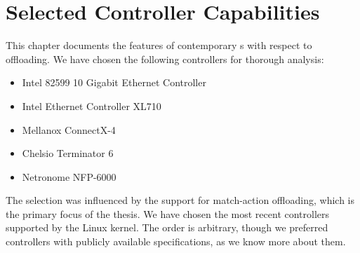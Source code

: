\chapter{Selected Controller Capabilities}
\label{chap:nics}

This chapter documents the features of contemporary s with respect to
offloading. We have chosen the following controllers for thorough analysis:

\begin{itemize}
	\item Intel 82599 10 Gigabit Ethernet Controller
	\item Intel Ethernet Controller XL710
	\item Mellanox ConnectX-4
	\item Chelsio Terminator 6
	\item Netronome NFP-6000
\end{itemize}

The selection was influenced by the support for match-action offloading, which is the
primary focus of the thesis. We have chosen the most recent controllers
supported by the Linux kernel. The order is arbitrary, though we preferred
controllers with publicly available specifications, as we know more about them.


\newcommand{\sect}[1]{\todo{Fix the \textbackslash sect!}}








